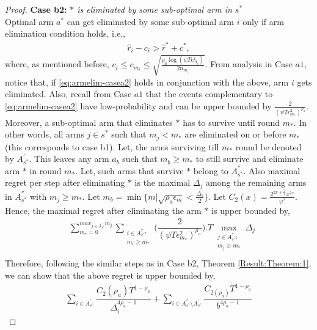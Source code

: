 \begin{proof}
 
\textbf{Case b2:} \textit{${*}$ is eliminated by some sub-optimal arm in $s^*$} \\
Optimal arm $a^*$ can get eliminated by some sub-optimal arm $i$ only if arm elimination condition holds, i.e., 
\begin{align*}
\hat r_{i} - c_{i} > \hat{r}^{*}+ c^{*},
\end{align*}
where, as mentioned before, $c_{i} \leq c_{m_{i}} \leq \sqrt{\frac{\rho_{a}\log (\psi T\epsilon_{m_{i}}^{2})}{2 n_{m_{i}}}}$.
From analysis in Case $a1$, notice that, if \eqref{eq:armelim-casea2} holds in conjunction with the above, arm $i$ gets eliminated. Also, recall from Case $a1$ that the events complementary to \eqref{eq:armelim-casea2} have low-probability and can be upper bounded by $\frac{2}{(\psi  T\epsilon_{m_{*}}^{2})^{\rho_{a}}}$. Moreover, a sub-optimal arm that eliminates $*$ has to survive until round $m_*$. In other words, 
all arms ${j}\in s^{*}$ such that $m_{j} < m_{*}$ are eliminated on or before $m_*$ (this corresponds to case b1). 
Let, the arms surviving till $m_{*}$ round be denoted by $A^{'}_{s^{*}}$. This leaves any arm $a_{b}$ such that $m_{b}\geq m_{*} $ to still survive and eliminate arm ${*}$ in round $m_{*}$. Let, such arms that survive ${*}$ belong to $A^{''}_{s^{*}}$. Also maximal regret per step after eliminating ${*}$ is the maximal $\Delta_{j}$ among the remaining arms in $A^{''}_{s^{*}}$ with $m_{j}\geq m_{*}$.  Let $m_{b}=\min\lbrace m|\sqrt{\rho_{a}\epsilon_{m}}<\frac{\Delta_{b}}{2}\rbrace$. Let $C_2(x) = \frac{2^{2x+\frac{3}{2}}x^{2x}}{\psi^{x}}$. Hence, the maximal regret after eliminating the arm ${*}$ is upper bounded by, 
\begin{align*}
&\sum_{m_{*}=0}^{max_{j\in A^{'}_{s^{*}}}m_{j}}\sum_{\substack{i\in A^{''}_{s^{*}}: \\ m_{i}\geq m_{*}}}\bigg(\dfrac{2}{(\psi  T\epsilon_{m_{*}}^{2})^{\rho_{a}}} \bigg).T\max_{\substack{j\in A^{''}_{s^{*}}: \\ m_{j}\geq m_{*}}}{\Delta}_{j}\\
\end{align*}
Therefore, following the similar steps as in Case b2, Theorem \ref{Result:Theorem:1}, we can show that the above regret is upper bounded by,
\begin{align*}
\sum_{i\in A^{'}_{s^{*}}}\dfrac{ C_{2}(\rho_{a}) T^{1-\rho_{a}}}{\Delta_{i}^{4\rho_{a}-1}} +\sum_{i\in A^{''}_{s^{*}}\setminus A^{'}_{s^{*}}}\dfrac{C_{2(\rho_{a})}T^{1-\rho_{a}}}{b^{4\rho_{a}-1}}
\end{align*}




\end{proof}
